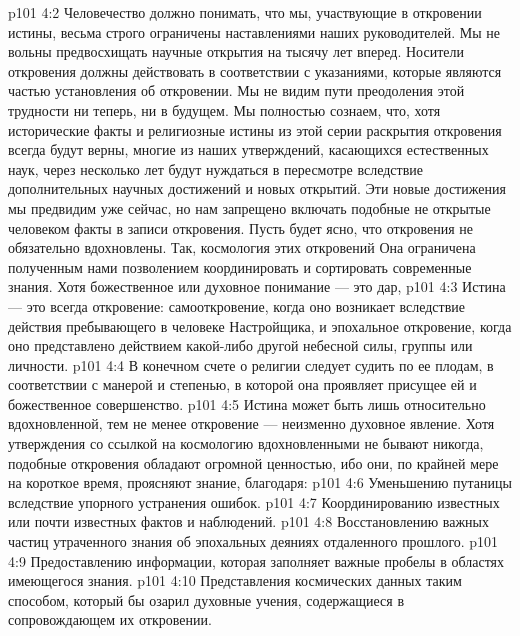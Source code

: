 \vs p101 4:2 Человечество должно понимать, что мы, участвующие в откровении истины, весьма строго ограничены наставлениями наших руководителей. Мы не вольны предвосхищать научные открытия на тысячу лет вперед. Носители откровения должны действовать в соответствии с указаниями, которые являются частью установления об откровении. Мы не видим пути преодоления этой трудности ни теперь, ни в будущем. Мы полностью сознаем, что, хотя исторические факты и религиозные истины из этой серии раскрытия откровения всегда будут верны, многие из наших утверждений, касающихся естественных наук, через несколько лет будут нуждаться в пересмотре вследствие дополнительных научных достижений и новых открытий. Эти новые достижения мы предвидим уже сейчас, но нам запрещено включать подобные не открытые человеком факты в записи откровения. Пусть будет ясно, что откровения не обязательно вдохновлены. Так, космология этих откровений  Она ограничена полученным нами позволением координировать и сортировать современные знания. Хотя божественное или духовное понимание --- это дар, 
\vs p101 4:3 \pc Истина --- это всегда откровение: самооткровение, когда оно возникает вследствие действия пребывающего в человеке Настройщика, и эпохальное откровение, когда оно представлено действием какой\hyp{}либо другой небесной силы, группы или личности.
\vs p101 4:4 В конечном счете о религии следует судить по ее плодам, в соответствии с манерой и степенью, в которой она проявляет присущее ей и божественное совершенство.
\vs p101 4:5 \pc Истина может быть лишь относительно вдохновленной, тем не менее откровение --- неизменно духовное явление. Хотя утверждения со ссылкой на космологию вдохновленными не бывают никогда, подобные откровения обладают огромной ценностью, ибо они, по крайней мере на короткое время, проясняют знание, благодаря:
\vs p101 4:6 \bibnobreakspace Уменьшению путаницы вследствие упорного устранения ошибок.
\vs p101 4:7 \bibnobreakspace Координированию известных или почти известных фактов и наблюдений.
\vs p101 4:8 \bibnobreakspace Восстановлению важных частиц утраченного знания об эпохальных деяниях отдаленного прошлого.
\vs p101 4:9 \bibnobreakspace Предоставлению информации, которая заполняет важные пробелы в областях имеющегося знания.
\vs p101 4:10 \bibnobreakspace Представления космических данных таким способом, который бы озарил духовные учения, содержащиеся в сопровождающем их откровении.
